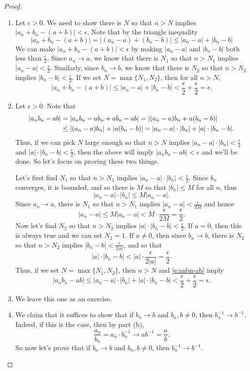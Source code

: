 \documentclass[11pt,dvipsnames]{book}
\numberwithin{equation}{section} %
\numberwithin{figure}{section} %
\numberwithin{table}{section} %
\begin{document}
\begin{proof}
\begin{enumerate}[label=(\alph*)]
\item Let $\epsilon>0$. We need to show there is $N$ so that $n > N$ implies $|a_{n}+b_{n}-(a+b)|<\epsilon$. Note that by the triangle inequality
\[
|a_{n}+b_{n}-(a+b)|
=|(a_n-a)+(b_n-b)|
\leq |a_{n}-a|+|b_{n}-b|
\]
We can make $|a_{n}+b_{n}-(a+b)|<\epsilon$ by making $|a_{n}-a|$ and $|b_{n}-b|$ both less than $\frac{\epsilon}{2}$. Since $a_n\rightarrow a$, we know that there is $N_{1}$ so that $n > N_1$ implies $|a_{n}-a|<\frac{\epsilon}{2}$. Similarly, since $b_n\rightarrow b$, we know that there is $N_{2}$ so that $n > N_2$ implies $|b_{n}-b|<\frac{\epsilon}{2}$. If we set $N=\max\{N_1,N_2\}$, then for all $n > N$,
\[
|a_{n}+b_{n}-(a+b)|
\leq |a_{n}-a|+|b_{n}-b|
<\frac{\epsilon}{2}+\frac{\epsilon}{2}=\epsilon. 
\]
\item Let $\epsilon>0$.  Note that
\begin{align}
|a_{n}b_{n}-ab|
& =|a_{n}b_{n}-ab_{n}+ab_{n}-ab|
=|(a_{n}-a)b_{n} + a(b_n-b)| \notag \\
& \leq |(a_{n}-a)b_{n}| + |a(b_n-b)|  
=|a_{n}-a|\cdot |b_{n}|+ |a|\cdot |b_{n}-b|.
\label{e:anbn-ab}
\end{align}
Thus, if we can pick $N$ large enough so that $n > N$ implies  $|a_{n}-a|\cdot |b_{n}|<\frac{\epsilon}{2}$ and $|a|\cdot |b_{n}-b|<\frac{\epsilon}{2}$, then the above will imply $|a_{n}b_{n}-ab|<\epsilon$ and we'll be done. So let's focus on proving these two things.

Let's first find $N_1$ so that $n > N_1$ implies $|a_{n}-a|\cdot |b_{n}|<\frac{\epsilon}{2}$. Since $b_n$ converges, it is bounded, and so there is $M$ so that $|b_{n}|\leq M$ for all $n$, thus
\[
|a_{n}-a|\cdot |b_{n}|\leq M|a_{n}-a|.
\]
Since $a_n\rightarrow a$, there is $N_1$ so that $n > N_1$ implies $|a_{n}-a|<\frac{\epsilon}{2M}$ and hence
\[
|a_{n}-a|\leq M|a_{n}-a|<M\cdot \frac{\epsilon}{2M}=\frac{\epsilon}{2}.
\]
Now let's find $N_2$ so that $n > N_2$ implies $|a|\cdot |b_{n}-b|<\frac{\epsilon}{2}$. If $a=0$, then this is always true and we can set $N_2=1$. If $a\neq 0$, then since $b_n\rightarrow b$, there is $N_2$ so that $n > N_2$ implies $|b_{n}-b|<\frac{\epsilon}{2|a|}$, and so that
\[
|a|\cdot |b_{n}-b|<|a|\cdot \frac{\epsilon}{2|a|}=\frac{\epsilon}{2}. 
\]
Thus, if we set $N=\max\{N_{1},N_{2}\}$, then $n > N$ and  \eqref{e:anbn-ab} imply
\[
|a_{n}b_{n}-ab|
\leq |a_{n}-a|\cdot |b_{n}|+ |a|\cdot |b_{n}-b|
<\frac{\epsilon}{2}+\frac{\epsilon}{2}=\epsilon.
\]
\item We leave this one as an exercise. 
\item We claim that it suffices to show that if $b_n\rightarrow b$ and $b_n,b\neq 0$, then $b_{n}^{-1}\rightarrow b^{-1}$. Indeed, if this is the case, then  by part (b),
\[
\frac{a_{n}}{b_{n}}=a_{n}\cdot b_{n}^{-1} \rightarrow ab^{-1}=\frac{a}{b}.
\]
So now let's prove that if $b_n\rightarrow b$ and $b_n,b\neq 0$, then $b_{n}^{-1}\rightarrow b^{-1}$.  \\


\end{enumerate}
\end{proof}
\end{document}
